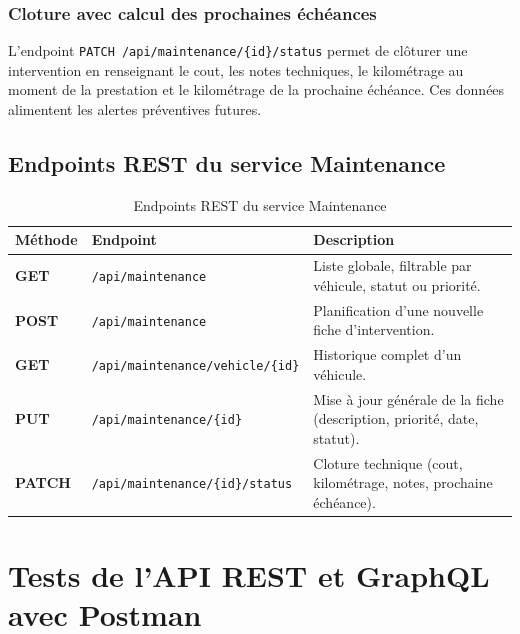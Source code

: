 \documentclass[12pt,a4paper]{article}
\begin{document}
\subsubsection{Cloture avec calcul des prochaines échéances}

L'endpoint \texttt{PATCH /api/maintenance/\{id\}/status} permet de clôturer une intervention en renseignant le cout, les notes techniques, le kilométrage au moment de la prestation et le kilométrage de la prochaine échéance. Ces données alimentent les alertes préventives futures.

\subsection{Endpoints REST du service Maintenance}

\begin{table}[H]
\centering
\small
\begin{tabular}{|l|l|p{7.5cm}|}
  \hline
  \rowcolor{primary!15}
  \textbf{Méthode} & \textbf{Endpoint} & \textbf{Description} \\
  \hline
  \textbf{GET} & \texttt{/api/maintenance} & Liste globale, filtrable par véhicule, statut ou priorité. \\
  \hline
  \textbf{POST} & \texttt{/api/maintenance} & Planification d'une nouvelle fiche d'intervention. \\
  \hline
  \textbf{GET} & \texttt{/api/maintenance/vehicle/\{id\}} & Historique complet d'un véhicule. \\
  \hline
  \textbf{PUT} & \texttt{/api/maintenance/\{id\}} & Mise à jour générale de la fiche (description, priorité, date, statut). \\
  \hline
  \textbf{PATCH} & \texttt{/api/maintenance/\{id\}/status} & Cloture technique (cout, kilométrage, notes, prochaine échéance). \\
  \hline
\end{tabular}
\caption{Endpoints REST du service Maintenance}
\end{table}

\newpage

\section{Tests de l'API REST et GraphQL avec Postman}
\label{sec:tests-postman}
\end{document}
